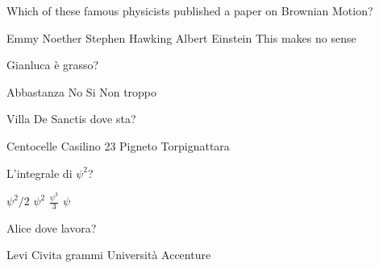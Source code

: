 \documentclass{exam}
\begin{document}
\begin{center}
\end{center}
\vspace{5mm}
\vspace{5mm}
\vspace{5mm}
\begin{questions}
\question[10] Which of these famous physicists published a paper on Brownian Motion?
\begin{choices}
\choice Emmy Noether
\choice Stephen Hawking 
\choice Albert Einstein
\choice This makes no sense
\end{choices}
\question[10] Gianluca è grasso?
\begin{choices}
\choice Abbastanza
\choice No
\choice Si
\choice Non troppo
\end{choices}
\question[10] Villa De Sanctis dove sta?
\begin{choices}
\choice Centocelle
\choice Casilino 23
\choice Pigneto
\choice Torpignattara
\end{choices}
\question[10] L'integrale di $\psi^{2}$?
\begin{choices}
\choice $\psi^{2}/2$
\choice $\psi^{2}$
\choice $\frac{\psi^{3}}{3}$
\choice $\psi$
\end{choices}
\question[10] Alice dove lavora?
\begin{choices}
\choice Levi Civita
 grammi
\choice Università
\choice Accenture
\end{choices}
\end{questions}
           
\end{document}
